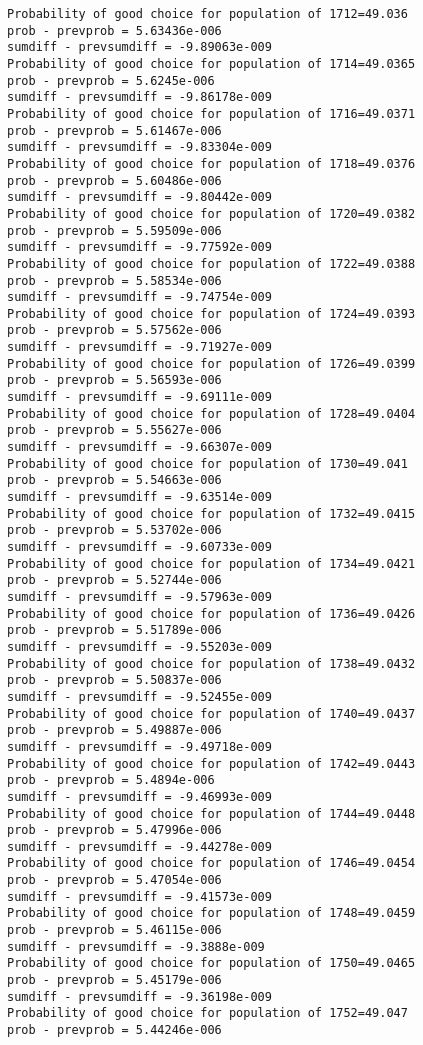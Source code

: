 \documentclass[11pt,onecolumn]{article}
\begin{document}
\begin{verbatim}
Probability of good choice for population of 1712=49.036
prob - prevprob = 5.63436e-006
sumdiff - prevsumdiff = -9.89063e-009
Probability of good choice for population of 1714=49.0365
prob - prevprob = 5.6245e-006
sumdiff - prevsumdiff = -9.86178e-009
Probability of good choice for population of 1716=49.0371
prob - prevprob = 5.61467e-006
sumdiff - prevsumdiff = -9.83304e-009
Probability of good choice for population of 1718=49.0376
prob - prevprob = 5.60486e-006
sumdiff - prevsumdiff = -9.80442e-009
Probability of good choice for population of 1720=49.0382
prob - prevprob = 5.59509e-006
sumdiff - prevsumdiff = -9.77592e-009
Probability of good choice for population of 1722=49.0388
prob - prevprob = 5.58534e-006
sumdiff - prevsumdiff = -9.74754e-009
Probability of good choice for population of 1724=49.0393
prob - prevprob = 5.57562e-006
sumdiff - prevsumdiff = -9.71927e-009
Probability of good choice for population of 1726=49.0399
prob - prevprob = 5.56593e-006
sumdiff - prevsumdiff = -9.69111e-009
Probability of good choice for population of 1728=49.0404
prob - prevprob = 5.55627e-006
sumdiff - prevsumdiff = -9.66307e-009
Probability of good choice for population of 1730=49.041
prob - prevprob = 5.54663e-006
sumdiff - prevsumdiff = -9.63514e-009
Probability of good choice for population of 1732=49.0415
prob - prevprob = 5.53702e-006
sumdiff - prevsumdiff = -9.60733e-009
Probability of good choice for population of 1734=49.0421
prob - prevprob = 5.52744e-006
sumdiff - prevsumdiff = -9.57963e-009
Probability of good choice for population of 1736=49.0426
prob - prevprob = 5.51789e-006
sumdiff - prevsumdiff = -9.55203e-009
Probability of good choice for population of 1738=49.0432
prob - prevprob = 5.50837e-006
sumdiff - prevsumdiff = -9.52455e-009
Probability of good choice for population of 1740=49.0437
prob - prevprob = 5.49887e-006
sumdiff - prevsumdiff = -9.49718e-009
Probability of good choice for population of 1742=49.0443
prob - prevprob = 5.4894e-006
sumdiff - prevsumdiff = -9.46993e-009
Probability of good choice for population of 1744=49.0448
prob - prevprob = 5.47996e-006
sumdiff - prevsumdiff = -9.44278e-009
Probability of good choice for population of 1746=49.0454
prob - prevprob = 5.47054e-006
sumdiff - prevsumdiff = -9.41573e-009
Probability of good choice for population of 1748=49.0459
prob - prevprob = 5.46115e-006
sumdiff - prevsumdiff = -9.3888e-009
Probability of good choice for population of 1750=49.0465
prob - prevprob = 5.45179e-006
sumdiff - prevsumdiff = -9.36198e-009
Probability of good choice for population of 1752=49.047
prob - prevprob = 5.44246e-006

\end{verbatim}
\end{document}
